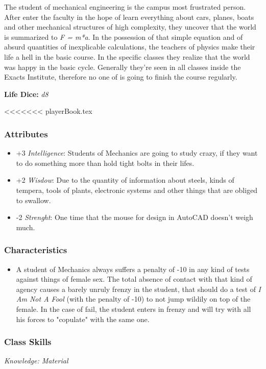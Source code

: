 \documentclass[ letterpaper,12pt]{article}
\begin{document}
The student of mechanical engineering is the campus most frustrated person. After enter the faculty in the hope of learn everything about cars, planes, boats and other mechanical structures of high complexity, they uncover that the world is summarized to {\it F = m*a}. In the possession of that simple equation and of absurd quantities of inexplicable calculations, the teachers of physics make their life a hell in the basic course. In the specific classes they realize that the world was happy in the basic cycle. Generally they're seen in all classes inside the Exacts Institute, therefore no one of is going to finish the course regularly.

{\bf Life Dice: } {\it d8}

<<<<<<< playerBook.tex
\subsubsection{Attributes}
\begin{itemize}
\item{+3 {\it Intelligence}: Students  of Mechanics are going to study crazy, if they want to  do something more than  hold tight bolts in their lifes.}
\item{+2 {\it Wisdow}: Due  to the quantity of information about steels,  kinds  of   tempera,   tools  of plants,  electronic   systems  and  other things that  are  obliged to swallow.}
\item{-2 {\it Strenght}: One  time that the  mouse  for  design  in  AutoCAD doesn't weigh much.}
\end{itemize}


\subsubsection{Characteristics}
\begin{itemize}
\item{A  student  of Mechanics always suffers a penalty of  -10  in  any  kind  of  tests against things of female sex.  The  total absence  of  contact  with  that  kind of agency causes a  barely unruly  frenzy in the  student,  that  should  do a test of {\it I Am Not A Fool} (with the penalty of -10) to not jump wildily on top of the female. In the  case  of fail, the student enters in  frenzy  and  will  try  with  all his forces to "copulate" with the same one.}
\end{itemize}

\subsubsection{Class Skills}
{\it Knowledge: Material}
\end{document}
